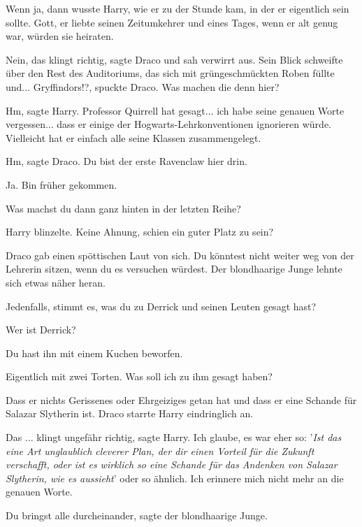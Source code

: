 Wenn ja, dann wusste Harry, wie er zu der Stunde kam, in der er eigentlich sein
sollte. Gott, er liebte seinen Zeitumkehrer und eines Tages, wenn er alt genug
war, würden sie heiraten.

\glqq{}Nein, das klingt richtig\grqq{}, sagte Draco und sah verwirrt aus. Sein
Blick schweifte über den Rest des Auditoriums, das sich mit grüngeschmückten
Roben füllte und... \glqq{}Gryffindors!?\grqq{}, spuckte Draco. \glqq{}Was machen
die denn hier?\grqq{}

\glqq{}Hm\grqq{}, sagte Harry. \glqq{}Professor Quirrell hat gesagt... ich habe
seine genauen Worte vergessen... dass er einige der Hogwarts-Lehrkonventionen
ignorieren würde. Vielleicht hat er einfach alle seine Klassen
zusammengelegt.\grqq{}

\glqq{}Hm\grqq{}, sagte Draco. \glqq{}Du bist der erste Ravenclaw hier
drin.\grqq{}

\glqq{}Ja. Bin früher gekommen.\grqq{}

\glqq{}Was machst du dann ganz hinten in der letzten Reihe?\grqq{}

Harry blinzelte. \glqq{}Keine Ahnung, schien ein guter Platz zu sein?\grqq{}

Draco gab einen spöttischen Laut von sich. \glqq{}Du könntest nicht weiter weg
von der Lehrerin sitzen, wenn du es versuchen würdest.\grqq{} Der blondhaarige
Junge lehnte sich etwas näher heran.

\glqq{}Jedenfalls, stimmt es, was du zu Derrick und seinen Leuten gesagt
hast?\grqq{}

\glqq{}Wer ist Derrick?\grqq{}

\glqq{}Du hast ihn mit einem Kuchen beworfen.\grqq{}

\glqq{}Eigentlich mit zwei Torten. Was soll ich zu ihm gesagt haben?\grqq{}

\glqq{}Dass er nichts Gerissenes oder Ehrgeiziges getan hat und dass er eine
Schande für Salazar Slytherin ist.\grqq{} Draco starrte Harry eindringlich an.

\glqq{}Das ... klingt ungefähr richtig\grqq{}, sagte Harry. \glqq{}Ich glaube, es
war eher so: '\emph{Ist das eine Art unglaublich cleverer Plan, der dir einen
Vorteil für die Zukunft verschafft, oder ist es wirklich so eine Schande für das
Andenken von Salazar Slytherin, wie es aussieht}' oder so ähnlich. Ich erinnere
mich nicht mehr an die genauen Worte.\grqq{}

\glqq{}Du bringst alle durcheinander\grqq{}, sagte der blondhaarige Junge.

